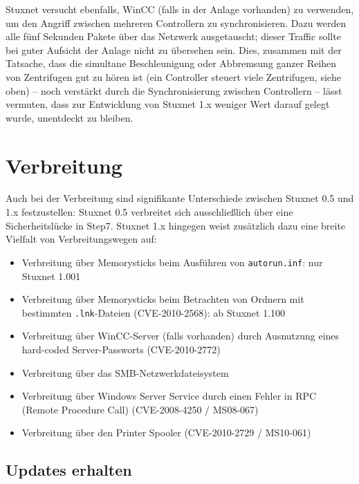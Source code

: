 \documentclass[a4paper]{article}
\begin{document}
Stuxnet versucht ebenfalls, WinCC (falls in der Anlage vorhanden) zu verwenden, um den Angriff zwischen mehreren Controllern zu synchronisieren.\cite{dossier} %
Dazu werden alle fünf Sekunden Pakete über das Netzwerk ausgetauscht; dieser Traffic sollte bei guter Aufsicht der Anlage nicht zu übersehen sein.
Dies, zusammen mit der Tatsache, dass die simultane Beschleunigung oder Abbremsung ganzer Reihen von Zentrifugen gut zu hören ist
(ein Controller steuert viele Zentrifugen, siehe oben) – noch verstärkt durch die Synchronisierung zwischen Controllern –
lässt vermuten, dass zur Entwicklung von Stuxnet 1.x weniger Wert darauf gelegt wurde, unentdeckt zu bleiben.

\section{Verbreitung}

Auch bei der Verbreitung sind signifikante Unterschiede zwischen Stuxnet 0.5 und 1.x festzustellen:
Stuxnet 0.5 verbreitet sich ausschließlich über eine Sicherheitslücke in Step7.
Stuxnet 1.x hingegen weist zusätzlich dazu eine breite Vielfalt von Verbreitungswegen auf:

\begin{itemize}
\item Verbreitung über Memorysticks beim Ausführen von \texttt{autorun.inf}: nur Stuxnet 1.001\cite{dossier} %
\item Verbreitung über Memorysticks beim Betrachten von Ordnern mit bestimmten \texttt{.lnk}-Dateien (CVE-2010-2568\cite{CVE_lnk}): ab Stuxnet 1.100
\item Verbreitung über WinCC-Server (falls vorhanden) durch Ausnutzung eines hard-coded Server-Passworts (CVE-2010-2772\cite{CVE_wincc})
\item Verbreitung über das SMB-Netzwerkdateisystem
\item Verbreitung über Windows Server Service durch einen Fehler in RPC (Remote Procedure Call) (CVE-2008-4250\cite{CVE_rpc} / MS08-067\cite{MS_rpc})
\item Verbreitung über den Printer Spooler (CVE-2010-2729\cite{CVE_spooler} / MS10-061\cite{MS_spooler})
\end{itemize} %

\subsection{Updates erhalten}
\end{document}

